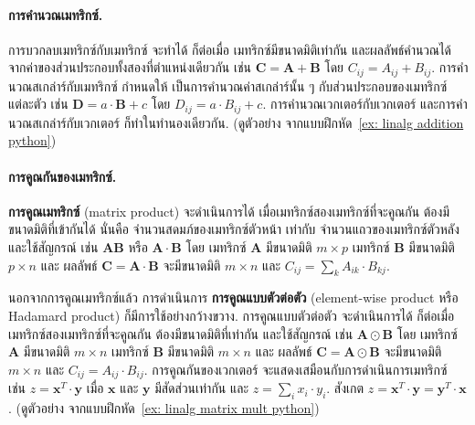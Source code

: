\paragraph{การคำนวณเมทริกซ์.}
การบวกลบเมทริกซ์กับเมทริกซ์ จะทำได้ ก็ต่อเมื่อ เมทริกซ์มีขนาดมิติเท่ากัน 
และผลลัพธ์คำนวณได้จากค่าของส่วนประกอบทั้งสองที่ตำแหน่งเดียวกัน เช่น
$\bm{C} = \bm{A} + \bm{B}$
โดย
$C_{ij} = A_{ij} + B_{ij}$.
%
การคำนวณสเกล่าร์กับเมทริกซ์
กำหนดให้ เป็นการคำนวณค่าสเกล่าร์นั้น ๆ กับส่วนประกอบของเมทริกซ์แต่ละตัว
เช่น
$\bm{D} = a \cdot \bm{B} + c$
โดย $D_{ij} = a \cdot B_{ij} + c$.
%
การคำนวณเวกเตอร์กับเวกเตอร์
และการคำนวณสเกล่าร์กับเวกเตอร์ ก็ทำในทำนองเดียวกัน.
(ดูตัวอย่าง จากแบบฝึกหัด~\ref{ex: linalg addition python})

\paragraph{การคูณกันของเมทริกซ์.} 
%
\textbf{การคูณเมทริกซ์} (matrix product)
จะดำเนินการได้ เมื่อเมทริกซ์สองเมทริกซ์ที่จะคูณกัน
ต้องมีขนาดมิติที่เข้ากันได้
นั่นคือ 
จำนวนสดมภ์ของเมทริกซ์ตัวหน้า
เท่ากับ
จำนวนแถวของเมทริกซ์ตัวหลัง
และใช้สัญกรณ์ เช่น 
$\bm{A} \bm{B}$ หรือ $\bm{A} \cdot \bm{B}$
โดย 
เมทริกซ์ $\bm{A}$ มีขนาดมิติ $m \times p$
เมทริกซ์ $\bm{B}$ มีขนาดมิติ $p \times n$
และ ผลลัพธ์ $\bm{C} = \bm{A} \cdot \bm{B}$ จะมีขนาดมิติ $m \times n$ และ $C_{ij} = \sum_k A_{ik} \cdot B_{kj}$.

นอกจากการคูณเมทริกซ์แล้ว
การดำเนินการ
\textbf{การคูณแบบตัวต่อตัว} (element-wise product หรือ Hadamard product)
ก็มีการใช้อย่างกว้างขวาง.
การคูณแบบตัวต่อตัว 
จะดำเนินการได้ ก็ต่อเมื่อ เมทริกซ์สองเมทริกซ์ที่จะคูณกัน
ต้องมีขนาดมิติที่เท่ากัน
และใช้สัญกรณ์ เช่น $\bm{A} \odot \bm{B}$
โดย
เมทริกซ์ $\bm{A}$ มีขนาดมิติ $m \times n$
เมทริกซ์ $\bm{B}$ มีขนาดมิติ $m \times n$
และ ผลลัพธ์ $\bm{C} = \bm{A} \odot \bm{B}$ จะมีขนาดมิติ $m \times n$ และ $C_{ij} = A_{ij} \cdot B_{ij}$.
%
การคูณกันของเวกเตอร์ จะแสดงเสมือนกับการดำเนินการเมทริกซ์ เช่น $z = \bm{x}^T \cdot \bm{y}$ เมื่อ $\bm{x}$ และ $\bm{y}$ มีสัดส่วนเท่ากัน และ $z = \sum_i x_i \cdot y_i$.
สังเกต 
$z = \bm{x}^T \cdot \bm{y} = \bm{y}^T \cdot \bm{x}$.
(ดูตัวอย่าง จากแบบฝึกหัด~\ref{ex: linalg matrix mult python})



